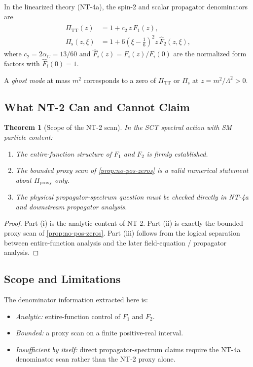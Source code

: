 \documentclass[11pt,a4paper]{article}
\theoremstyle{plain}
\newtheorem{theorem}{Theorem}[section]
\theoremstyle{definition}
\begin{document}
In the linearized theory (NT-4a), the spin-2 and scalar propagator
denominators are
\begin{align}
  \Pi_{\mathrm{TT}}(z) &= 1 + c_2\, z\, \hat{F}_1(z),
  \label{eq:Pi-TT}\\
  \Pi_{\mathrm{s}}(z,\xi) &= 1 + 6\left(\xi - \frac{1}{6}\right)^2
    z\, \hat{F}_2(z,\xi),
  \label{eq:Pi-s}
\end{align}
where $c_2 = 2\alpha_C = 13/60$ and
$\hat{F}_i(z) = F_i(z)/F_i(0)$ are the normalized form factors
with $\hat{F}_i(0) = 1$.

A \emph{ghost mode} at mass $m^2$ corresponds to a zero of
$\Pi_{\mathrm{TT}}$ or $\Pi_{\mathrm{s}}$ at $z = m^2/\Lambda^2 > 0$.

\subsection{What NT-2 Can and Cannot Claim}

\begin{theorem}[Scope of the NT-2 scan]\label{thm:ghost-freedom}
In the SCT spectral action with SM particle content:
\begin{enumerate}[nosep,label=(\roman*)]
  \item The entire-function structure of $F_1$ and $F_2$ is firmly
    established.
  \item The bounded proxy scan of \cref{prop:no-pos-zeros} is a valid
    numerical statement about $\Pi_{\mathrm{proxy}}$ only.
  \item The physical propagator-spectrum question must be checked directly
    in NT-4a and downstream propagator analysis.
\end{enumerate}
\end{theorem}

\begin{proof}
Part (i) is the analytic content of NT-2.
Part (ii) is exactly the bounded proxy scan of \cref{prop:no-pos-zeros}.
Part (iii) follows from the logical separation between entire-function
analysis and the later field-equation / propagator analysis.
\end{proof}

\subsection{Scope and Limitations}

The denominator information extracted here is:
\begin{itemize}[nosep]
  \item \emph{Analytic:} entire-function control of $F_1$ and $F_2$.
  \item \emph{Bounded:} a proxy scan on a finite positive-real interval.
  \item \emph{Insufficient by itself:} direct propagator-spectrum claims
    require the NT-4a denominator scan rather than the NT-2 proxy alone.
\end{itemize}
\end{document}
